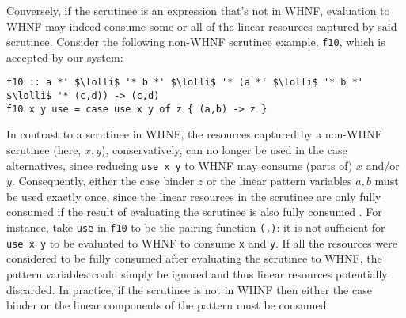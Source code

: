 \documentclass[acmsmall,review,screen]{acmart}
\newcommand{\incode}[1]{\lstinline{#1}}
\newcommand{\lolli}{\multimap}
\newcommand{\ROUNDTWO}[1]{{\color{red}#1}}
\begin{document}
\ROUNDTWO{Conversely}, if the scrutinee is an expression that's not in WHNF,
evaluation to WHNF \ROUNDTWO{may indeed} consume \ROUNDTWO{some or all of the}
linear resources \ROUNDTWO{captured by said scrutinee}. \ROUNDTWO{Consider the following
non-WHNF scrutinee example},
\incode{f10}, \ROUNDTWO{which is accepted} by our system:
\begin{notyet}
\begin{lstlisting}
f10 :: a *' $\lolli$ '* b *' $\lolli$ '* (a *' $\lolli$ '* b *' $\lolli$ '* (c,d)) -> (c,d)
f10 x y use = case use x y of z { (a,b) -> z }
\end{lstlisting}
\end{notyet}
\ROUNDTWO{In contrast to} a scrutinee in WHNF, \ROUNDTWO{the resources captured
by a non-WHNF scrutinee} (here, $x,y$), \ROUNDTWO{conservatively, can no longer
be used} in the case alternatives, \ROUNDTWO{since reducing \incode{use x y} to
WHNF may consume (parts of) $x$ and/or $y$}. \ROUNDTWO{Consequently}, either the case
binder $z$ or the linear pattern variables $a,b$ must be used exactly
once,
%
%
since the linear resources in the scrutinee are \ROUNDTWO{only} fully consumed
if the result of evaluating the scrutinee \ROUNDTWO{is also} fully consumed . %
For instance, take
\incode{use} in \incode{f10} to be the pairing function \incode{(,)}: it is not
sufficient for \incode{use x y} to be evaluated to WHNF to consume \incode{x}
and \incode{y}.
%
If all the resources were considered to be fully consumed after
\ROUNDTWO{evaluating the} scrutinee to \ROUNDTWO{WHNF}, the pattern variables
could simply be ignored and thus linear resources potentially discarded.
In \ROUNDTWO{practice}, if the scrutinee is not in WHNF then \ROUNDTWO{either}
the case binder or the linear components of the pattern \ROUNDTWO{must be consumed}.
\end{document}

